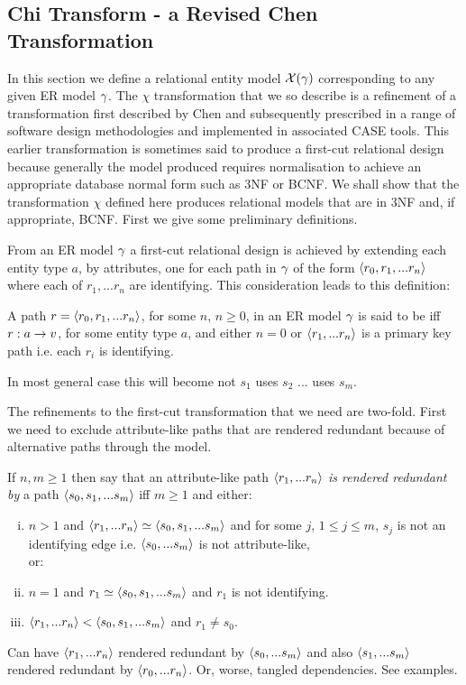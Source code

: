 \subsection{Chi Transform - a Revised Chen Transformation}
In this section we define a relational  entity model $\mathcal{X}(\gamma)$ corresponding 
to any given ER model $\gamma$. The $\chi$ transformation that we so describe is a refinement
of a transformation first described by Chen and subsequently prescribed in a range of software design methodologies and implemented in associated CASE tools. This earlier transformation is sometimes said to produce a first-cut relational design because generally the model produced requires normalisation
to achieve an appropriate database normal form such as 3NF or BCNF. 
We shall show that 
the transformation $\chi$ defined here produces relational models that are in 3NF and, if appropriate, BCNF.
First we give some preliminary definitions.

From an ER model $\gamma$ a first-cut relational design is achieved by extending each
entity type $a$, by attributes,  one for each path in $\gamma$ of the 
form $\langle r_0,r_1,...r_n\rangle$ where each of $r_1,...r_n$ are identifying. This consideration leads 
to this definition:
\begin{definition}
A path $r=\langle r_0,r_1,...r_n\rangle$, for some $n$, $n \geq 0$, in an ER model $\gamma$ is 
said to be  iff $r: a \rightarrow v$, for some entity type $a$,
and either $n=0$ or $\langle r_1,...r_n\rangle$ is a primary key path i.e. each $r_i$ is identifying.
\end{definition}
\begin{noteforfuture}
In most general case this will become not $s_1$ uses $s_2$ ... uses $s_m$.
\end{noteforfuture}
The refinements to the first-cut transformation that we need are two-fold. First we need
to exclude attribute-like paths that are rendered redundant because of alternative paths through the 
model. 
\begin{definition}
If $n,m \geq 1$ then say that an attribute-like  path $\langle r_1,...r_n\rangle$ \textit{is rendered redundant by} a path 
$\langle s_0,s_1,...s_m\rangle$ iff $m \geq 1$ and either:
\begin{enumerate} [(i)]
\item $n > 1$ and $\langle r_1,...r_n\rangle \simeq  \langle s_0,s_1,...s_m\rangle$ and 
for some $j$, $1 \leq j \leq m$, $s_j$ is not an identifying edge i.e. $\langle s_0,...s_m\rangle$
is not attribute-like, \\
 \hspace{1cm} or:
\item $n=1$ and $r_1 \simeq \langle s_0,s_1,...s_m\rangle$ and $r_1$ is not identifying.
\item $\langle r_1,...r_n\rangle <  \langle s_0,s_1,...s_m\rangle$ and $r_1 \neq s_0$.
\end{enumerate}
\end{definition}
\begin{problem}
Can have $\langle r_1,...r_n\rangle$ rendered redundant by $\langle s_0,...s_m\rangle$
and also $\langle s_1,...s_m\rangle$ rendered redundant by $\langle r_0,...r_n\rangle$. Or, worse, tangled dependencies. See examples.
\end{problem}

